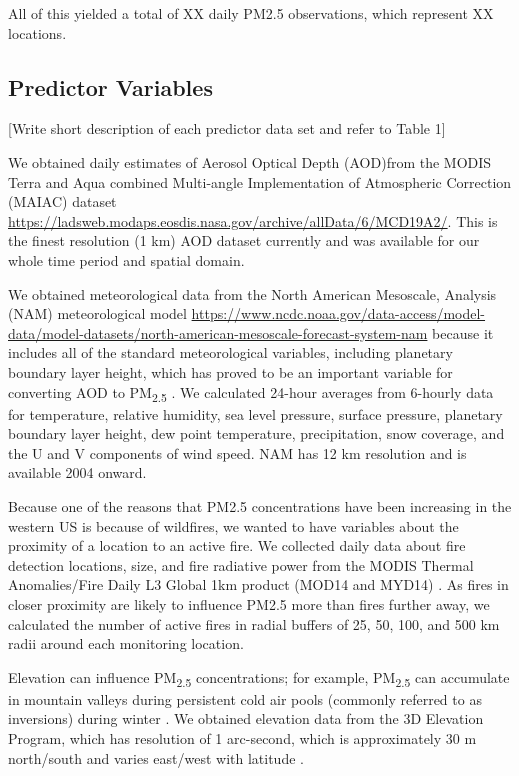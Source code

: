 \documentclass[english]{article}
\begin{document}
All of this yielded a total of XX daily PM2.5 observations, which represent XX locations. 

\subsection*{Predictor Variables}

[Write short description of each predictor data set and refer to Table 1]

We obtained daily estimates of Aerosol Optical Depth (AOD)from the MODIS Terra and Aqua combined Multi-angle Implementation of Atmospheric Correction (MAIAC) dataset \url{https://ladsweb.modaps.eosdis.nasa.gov/archive/allData/6/MCD19A2/}. This is the finest resolution (1 km) AOD dataset currently and was available for our whole time period and spatial domain. 


We obtained meteorological data from the North American Mesoscale, Analysis (NAM) meteorological model \url{https://www.ncdc.noaa.gov/data-access/model-data/model-datasets/north-american-mesoscale-forecast-system-nam} because it includes all of the standard meteorological variables, including planetary boundary layer height, which has proved to be an important variable for converting AOD to PM\textsubscript{2.5} \citep{liu_estimating_2005}. We calculated 24-hour averages from 6-hourly data for temperature, relative humidity, sea level pressure, surface pressure, planetary boundary layer height, dew point temperature, precipitation, snow coverage, and the U and V components of wind speed. NAM has 12 km resolution and is available 2004 onward.

Because one of the reasons that PM2.5 concentrations have been increasing in the western US is because of wildfires, we wanted to have variables about the proximity of a location to an active fire. We collected daily data about fire detection locations, size, and fire radiative power from the MODIS Thermal Anomalies/Fire Daily L3 Global 1km product (MOD14 and MYD14) \citep{Giglio2006,Hawbaker2017}. As fires in closer proximity are likely to influence PM2.5 more than fires further away, we calculated the number of active fires in radial buffers of 25, 50, 100, and 500 km radii around each monitoring location. 

Elevation can influence PM\textsubscript{2.5} concentrations; for example, PM\textsubscript{2.5} can accumulate in mountain valleys during persistent cold air pools (commonly referred to as inversions) 
during winter \citep{Whiteman2014}. We obtained elevation data from the 3D Elevation Program, which has resolution of 1 arc-second, which is approximately 30 m north/south and varies east/west with latitude \citep{USGSElevation2017}.
\end{document}
